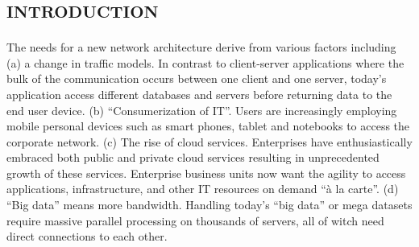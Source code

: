 %
\section*{\small \textsc{introduction}}
The needs for a new network architecture derive from various factors including (a) a change in traffic models. In contrast to client-server applications where the bulk of the communication occurs between one client and one server, today's application access different databases and servers before returning data to the end user device. (b) ``Consumerization of \ac{IT}''. Users are increasingly employing mobile personal devices such as smart phones, tablet and notebooks to access the corporate network. (c) The rise of cloud services. Enterprises have enthusiastically embraced both public and private cloud services resulting in unprecedented growth of these services. Enterprise business units now want the agility to access applications, infrastructure, and other \ac{IT} resources on demand ``à la carte''. (d) ``Big data'' means more bandwidth. Handling today's ``big data'' or mega datasets require massive parallel processing on thousands of servers, all of witch need direct connections to each other.

